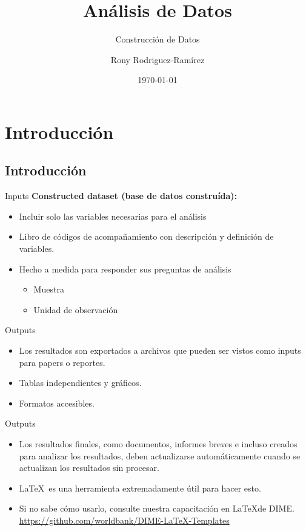 \documentclass[10pt, aspectratio=169, compress]{beamer}
\title{Análisis de Datos}
\subtitle{Construcción de Datos}
\author{Rony Rodriguez-Ramírez}
\institute{LAMBDA}
\date{\today}
\begin{document}
\begin{frame}[plain]
	\maketitle 
\end{frame}
\section{Introducción}
\subsection{Introducción}
\begin{frame}[t]{Inputs}
	\textbf{Constructed dataset (base de datos construída):}
	\begin{itemize}
		\item Incluir solo las variables necesarias para el análisis
		\item Libro de códigos de acompañamiento con descripción y definición de variables.
		\item Hecho a medida para responder sus preguntas de análisis
		\begin{itemize}
			\item Muestra
			\item Unidad de observación
		\end{itemize}
	\end{itemize}
\end{frame}
\begin{frame}[t]{Outputs}
	\begin{itemize}
		\item Los resultados son exportados a archivos que pueden ser vistos como inputs para papers o reportes.
		\item Tablas independientes y gráficos. 
		\item Formatos accesibles.
	\end{itemize}
\end{frame}
\begin{frame}[t]{Outputs}
	\begin{itemize}
		\item Los resultados finales, como documentos, informes breves e incluso creados para analizar los resultados, deben actualizarse automáticamente cuando se actualizan los resultados sin procesar.
		\item \LaTeX~es una herramienta extremadamente útil para hacer esto.
		\item Si no sabe cómo usarlo, consulte nuestra capacitación en \LaTeX de DIME. \href{https://github.com/worldbank/DIME-LaTeX-Templates}{https://github.com/worldbank/DIME-LaTeX-Templates}
	\end{itemize}
\end{frame}
\end{document}
